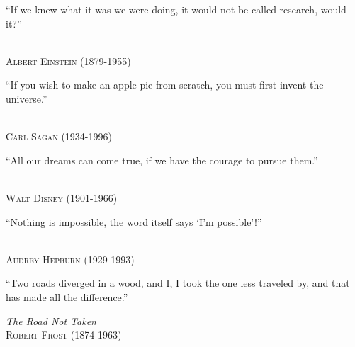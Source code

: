 \thispagestyle{empty}
\setlength{\epigraphwidth}{5.in}


\linespread{1.5}
\epigraph{\vspace{1.5in}\normalsize ``If we knew what it was we were doing, it would not be called research, would it?''}
  {\normalsize \textsc{\\Albert Einstein} (1879-1955)}


\linespread{1.5}
\epigraph{\vspace{1.5in}\normalsize ``If you wish to make an apple pie from scratch, you must first invent the universe.''}
  {\normalsize \textsc{\\Carl Sagan} (1934-1996)}

\linespread{1.5}
\epigraph{\vspace{1.5in}\normalsize ``All our dreams can come true, if we have the courage to pursue them.''}
  {\normalsize \textsc{\\Walt Disney} (1901-1966)}


\linespread{1.5}
\epigraph{\vspace{1.5in}\normalsize ``Nothing is impossible, the word itself says `I'm possible'!''}
  {\normalsize \textsc{\\Audrey Hepburn} (1929-1993)}


\linespread{1.5}
\epigraph{\vspace{1.5in}\normalsize ``Two roads diverged in a wood, and I, I took the one less traveled by, and that has made all the difference.''}
  {\normalsize \textit{The Road Not Taken} \textsc{\\Robert Frost} (1874-1963)}



\newpage
\thispagestyle{empty}
\mbox{}
